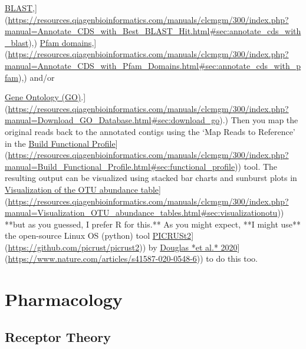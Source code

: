 \documentclass[
]{book}
\begin{document}
\href{\%5Bhttps://resources.qiagenbioinformatics.com/manuals/clcmgm/300/index.php?manual=Annotate_CDS_with_Best_BLAST_Hit.html\#sec:annotate_cds_with_blast}{BLAST},{]}(\url{https://resources.qiagenbioinformatics.com/manuals/clcmgm/300/index.php?manual=Annotate_CDS_with_Best_BLAST_Hit.html\#sec:annotate_cds_with_blast}),) \href{\%5Bhttps://resources.qiagenbioinformatics.com/manuals/clcmgm/300/index.php?manual=Annotate_CDS_with_Pfam_Domains.html\#sec:annotate_cds_with_pfam}{Pfam domains},{]}(\url{https://resources.qiagenbioinformatics.com/manuals/clcmgm/300/index.php?manual=Annotate_CDS_with_Pfam_Domains.html\#sec:annotate_cds_with_pfam}),) and/or

\href{\%5Bhttps://resources.qiagenbioinformatics.com/manuals/clcmgm/300/index.php?manual=Download_GO_Database.html\#sec:download_go}{Gene Ontology (GO)}.{]}(\url{https://resources.qiagenbioinformatics.com/manuals/clcmgm/300/index.php?manual=Download_GO_Database.html\#sec:download_go}).) Then you map the original reads back to the annotated contigs using the `Map Reads to Reference' in the \href{\%5Bhttps://resources.qiagenbioinformatics.com/manuals/clcmgm/300/index.php?manual=Build_Functional_Profile.html\#sec:functional_profile}{Build Functional Profile}{]}(\url{https://resources.qiagenbioinformatics.com/manuals/clcmgm/300/index.php?manual=Build_Functional_Profile.html\#sec:functional_profile})) tool. The resulting output can be visualized using stacked bar charts and sunburst plots in \href{\%5Bhttps://resources.qiagenbioinformatics.com/manuals/clcmgm/300/index.php?manual=Visualization_OTU_abundance_tables.html\#sec:visualizationotu}{Visualization of the OTU abundance table}{]}(\url{https://resources.qiagenbioinformatics.com/manuals/clcmgm/300/index.php?manual=Visualization_OTU_abundance_tables.html\#sec:visualizationotu})) **but as you guessed, I prefer R for this.** As you might expect, **I might use** the open-source Linux OS (python) tool \href{\%5Bhttps://github.com/picrust/picrust2}{PICRUSt2}{]}(\url{https://github.com/picrust/picrust2})) by \href{\%5Bhttps://www.nature.com/articles/s41587-020-0548-6}{Douglas *et al.* 2020}{]}(\url{https://www.nature.com/articles/s41587-020-0548-6})) to do this too.

\chapter{Pharmacology}\label{pharmacology}

\section{Receptor Theory}\label{receptor-theory}
\end{document}

